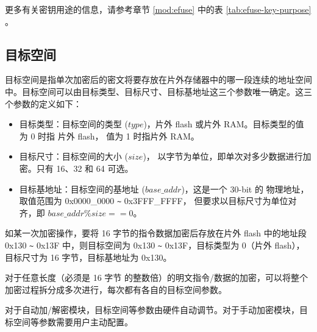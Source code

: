 \documentclass[main\_\_CN.tex]{subfiles}
\begin{document}


更多有关密钥用途的信息，请参考章节 \ref{mod:efuse} \textit{} 中的表 \ref{tab:efuse-key-purpose} \textit{}。

\subsection{目标空间}
\label{sec:xts-aes-object-space}
目标空间是指单次加密后的密文将要存放在片外存储器中的哪一段连续的地址空间中。目标空间可以由目标类型、目标尺寸、目标基地址这三个参数唯一确定。这三个参数的定义如下：
\begin{itemize}
    \item 目标类型：目标空间的类型 (\begin{math} type \end{math})，片外 flash 或片外 RAM。目标类型的值为 0 时指 片外 flash， 值为 1 时指片外 RAM。
    \item 目标尺寸：目标空间的大小 (\begin{math} size \end{math})， 以字节为单位，即单次对多少数据进行加密。只有 16、32 和 64 可选。
    \item 目标基地址：目标空间的基地址 (\begin{math} base\_addr\end{math})，这是一个 30-bit 的 物理地址，取值范围为 0x{}0000\_0000 \verb+~+ 0x{}3FFF\_FFFF， 但要求以目标尺寸为单位对齐，即 \begin{math} base\_addr \% size == 0 \end{math}。
\end{itemize}

如某一次加密操作，要将 16 字节的指令数据加密后存放在片外 flash 中的地址段 0x{}130 \verb+~+ 0x{}13F 中，则目标空间为 0x{}130 \verb+~+ 0x{}13F，目标类型为 0（片外 flash），目标尺寸为 16 字节，目标基地址为 0x{}130。

对于任意长度（必须是 16 字节 的整数倍）的明文指令/数据的加密，可以将整个加密过程拆分成多次进行，每次都有各自的目标空间参数。

对于自动加/解密模块，目标空间等参数由硬件自动调节。对于手动加密模块，目标空间等参数需要用户主动配置。
\end{document}
